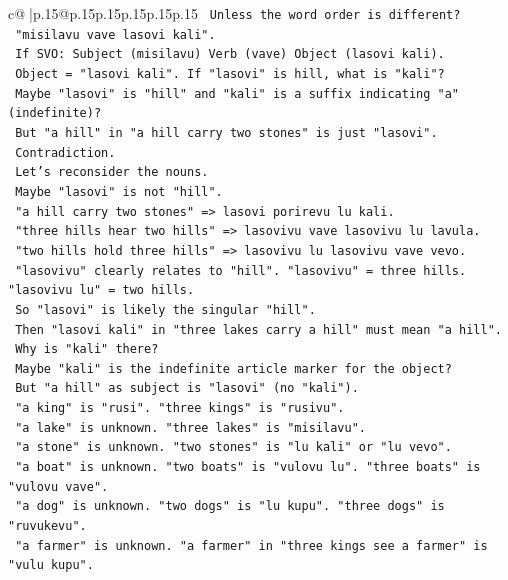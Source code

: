 \documentclass{article}
\begin{document}
{\begin{supertabular}{c@{$\;$}|p{.15\linewidth}@{}p{.15\linewidth}p{.15\linewidth}p{.15\linewidth}p{.15\linewidth}p{.15\linewidth}}
{{{\texttt{   Unless the word order is different?} \\
\texttt{   "misilavu vave lasovi kali".} \\
\texttt{   If SVO: Subject (misilavu) Verb (vave) Object (lasovi kali).} \\
\texttt{   Object = "lasovi kali". If "lasovi" is hill, what is "kali"?} \\
\texttt{   Maybe "lasovi" is "hill" and "kali" is a suffix indicating "a" (indefinite)?} \\
\texttt{   But "a hill" in "a hill carry two stones" is just "lasovi".} \\
\texttt{   Contradiction.} \\
\texttt{   Let's reconsider the nouns.} \\
\texttt{   Maybe "lasovi" is not "hill".} \\
\texttt{   "a hill carry two stones" => lasovi porirevu lu kali.} \\
\texttt{   "three hills hear two hills" => lasovivu vave lasovivu lu lavula.} \\
\texttt{   "two hills hold three hills" => lasovivu lu lasovivu vave vevo.} \\
\texttt{   "lasovivu" clearly relates to "hill". "lasovivu" = three hills. "lasovivu lu" = two hills.} \\
\texttt{   So "lasovi" is likely the singular "hill".} \\
\texttt{   Then "lasovi kali" in "three lakes carry a hill" must mean "a hill".} \\
\texttt{   Why is "kali" there?} \\
\texttt{   Maybe "kali" is the indefinite article marker for the object?} \\
\texttt{   But "a hill" as subject is "lasovi" (no "kali").} \\
\texttt{   "a king" is "rusi". "three kings" is "rusivu".} \\
\texttt{   "a lake" is unknown. "three lakes" is "misilavu".} \\
\texttt{   "a stone" is unknown. "two stones" is "lu kali" or "lu vevo".} \\
\texttt{   "a boat" is unknown. "two boats" is "vulovu lu". "three boats" is "vulovu vave".} \\
\texttt{   "a dog" is unknown. "two dogs" is "lu kupu". "three dogs" is "ruvukevu".} \\
\texttt{   "a farmer" is unknown. "a farmer" in "three kings see a farmer" is "vulu kupu".} \\
}}}
\end{supertabular}}
\end{document}
